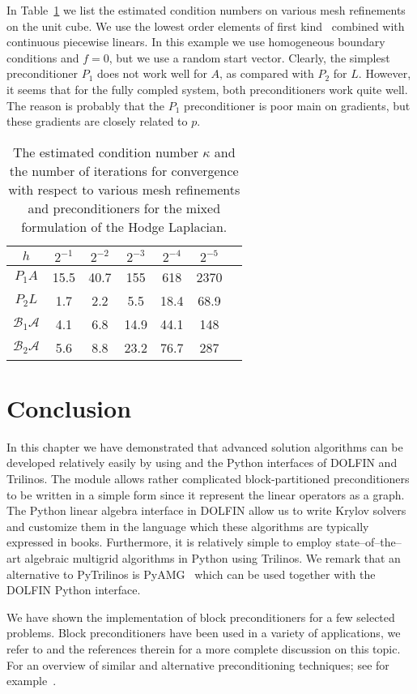 In Table~\ref{table:hodge} we list the estimated condition numbers on
various mesh refinements on the unit cube. We use the lowest
order \nedelec{} elements of first kind~\citep{Nedelec1980} combined
with continuous piecewise linears. In this example we use homogeneous
boundary conditions and $f=0$, but we use a random start vector.
Clearly, the simplest preconditioner $P_1$ does not work well for
$A$, as compared with $P_2$ for $L$. However, it seems that
for the fully compled system, both preconditioners work quite
well. The reason is probably that the $P_1$ preconditioner
is poor main on gradients, but these gradients are closely related to
$p$.
\begin{table}
\begin{center}
\begin{tabular}{|c||c|c|c|c|c|c|}
\hline
$h$ & $2^{-1}$ & $2^{-2}$ & $2^{-3}$ & $2^{-4}$  & $2^{-5}$ \\ \hline
$ P_1 A $ & 15.5 & 40.7 & 155 & 618 & 2370 \\ \hline
$ P_2 L $ & 1.7 & 2.2  & 5.5  & 18.4 & 68.9 \\ \hline
$\mathcal{B}_1 \mathcal{A}$ & 4.1 & 6.8 & 14.9 & 44.1 & 148 \\ \hline
$\mathcal{B}_2 \mathcal{A}$ & 5.6 & 8.8 & 23.2 & 76.7  & 287 \\ \hline
\end{tabular}
\caption{The estimated condition number $\kappa$ and the number of iterations for
  convergence with respect to various mesh refinements and preconditioners for the mixed formulation of the Hodge Laplacian.}  \label{table:hodge}
\end{center}
\end{table}



\section{Conclusion}

In this chapter we have demonstrated that advanced solution algorithms
can be developed relatively easily by using  and the Python interfaces of
DOLFIN and Trilinos. The  module allows rather complicated block-partitioned preconditioners to be
written in a simple form since it represent the linear operators as a graph.
The Python linear algebra interface in DOLFIN
allow us to write Krylov solvers and customize them in the language
which these algorithms are typically expressed in books.  Furthermore,
it is relatively simple to employ state--of--the--art algebraic
multigrid algorithms in Python using Trilinos.  We remark that an
alternative to PyTrilinos is PyAMG~\citep{BellOlsonSchroder2009} which
can be used together with the DOLFIN Python interface.

We have shown the implementation of block preconditioners for a few
selected problems.  Block preconditioners have been used in a variety
of applications, we refer to \citet{MardalWinther11} and the
references therein for a more complete discussion on this topic.  For
an overview of similar and alternative preconditioning techniques; see
for example~\citet{BenziGolubLiesen2005,ElmanSilvesterWathen2005,Hiptmair2006,Kirby2010}.
